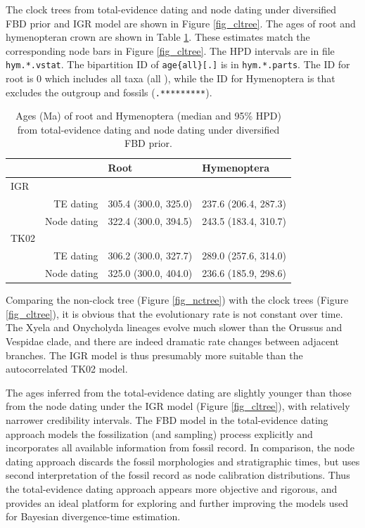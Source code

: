 \documentclass[12pt]{article}
\begin{document}
The clock trees from total-evidence dating and node dating under diversified FBD prior and IGR model are shown in Figure \ref{fig_cltree}.
The ages of root and hymenopteran crown are shown in Table \ref{tab_age}.
These estimates match the corresponding node bars in Figure \ref{fig_cltree}.
The HPD intervals are in file {\tt hym.*.vstat}.
The bipartition ID of {\tt age\{all\}[.]} is in {\tt hym.*.parts}.
The ID for root is 0 which includes all taxa (all {\tt *}), while the ID for Hymenoptera is that excludes the outgroup and fossils ({\tt .*********}). 

\begin{table}[p]
\caption{Ages (Ma) of root and Hymenoptera (median and 95\% HPD) from total-evidence dating and node dating under diversified FBD prior.} 
\label{tab_age} 
\begin{tabular}{lrll}
\hline
    &               & Root                 & Hymenoptera          \\
\hline
IGR &               &                      &                      \\
    &  TE dating    & 305.4 (300.0, 325.0) & 237.6 (206.4, 287.3) \\
    &  Node dating  & 322.4 (300.0, 394.5) & 243.5 (183.4, 310.7) \\
TK02&               &                      &                      \\
    &  TE dating    & 306.2 (300.0, 327.7) & 289.0 (257.6, 314.0) \\
    &  Node dating  & 325.0 (300.0, 404.0) & 236.6 (185.9, 298.6) \\
\hline 
\end{tabular}
\end{table}

Comparing the non-clock tree (Figure \ref{fig_nctree}) with the clock trees (Figure \ref{fig_cltree}), it is obvious that the evolutionary rate is not constant over time.
The Xyela and Onycholyda lineages evolve much slower than the Orussus and Vespidae clade, and there are indeed dramatic rate changes between adjacent branches.
The IGR model is thus presumably more suitable than the autocorrelated TK02 model.

The ages inferred from the total-evidence dating are slightly younger than those from the node dating under the IGR model (Figure \ref{fig_cltree}), with relatively narrower credibility intervals.
The FBD model in the total-evidence dating approach models the fossilization (and sampling) process explicitly and incorporates all available information from fossil record.
In comparison, the node dating approach discards the fossil morphologies and stratigraphic times, but uses second interpretation of the fossil record as node calibration distributions.
Thus the total-evidence dating approach appears more objective and rigorous, and provides an ideal platform for exploring and further improving the models used for Bayesian divergence-time estimation.
\end{document}
